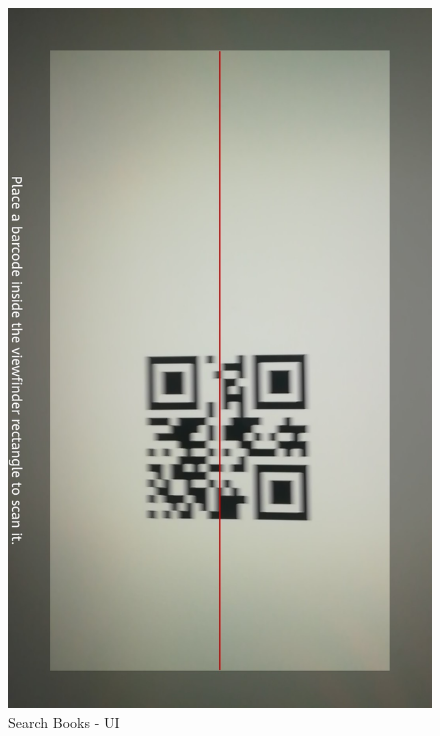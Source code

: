 \begin{figure}[H]
	\hspace{0.5cm}
	\includegraphics[scale=0.15]{Images/UI/Search/2}
	\caption{Search Books - UI}
\end{figure}

